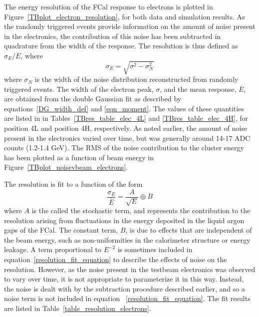 The energy resolution of the FCal response to electrons is plotted in Figure~\ref{TBplot_electron_resolution}, for both data and simulation results. As the randomly triggered events provide information on the amount of noise present in the electronics, the contribution of this noise has been subtracted in quadrature from the width of the response. The resolution is thus defined as $\sigma_E/\overline{E}$, where
\begin{equation}
\sigma_E = \sqrt{\sigma^2 - \sigma_N^2}
\end{equation}
where $\sigma_N$ is the width of the noise distribution reconstructed from randomly triggered events. The width of the electron peak, $\sigma$, and the mean response, $\overline{E}$, are obtained from the double Gaussian fit as described by equations~\ref{DG_width_def} and \ref{eqn_moment}. The values of these quantities are listed in in Tables~\ref{TBres_table_elec_4L} and \ref{TBres_table_elec_4H}, for position 4L and position 4H, respectively. As noted earlier, the amount of noise present in the electronics varied over time, but was generally around 14-17 ADC counts (1.2-1.4 GeV). The RMS of the noise contribution to the cluster energy has been plotted as a function of beam energy in Figure~\ref{TBplot_noisevbeam_electrons}.


The resolution is fit to a function of the form
\begin{equation}
\frac{\sigma_E}{\overline{E}} = \frac{A}{\sqrt{E}} \oplus B
\label{resolution_fit_equation}
\end{equation}
where $A$ is the called the stochastic term, and represents the contribution to the resolution arising from fluctuations in the energy deposited in the liquid argon gaps of the FCal. The constant term, $B$, is due to effects that are independent of the beam energy, such as non-uniformities in the calorimeter structure or energy leakage. A term proportional to $E^{-2}$ is sometimes included in equation~\ref{resolution_fit_equation} to describe the effects of noise on the resolution. However, as the noise present in the testbeam electronics was observed to vary over time, it is not appropriate to parameterize it in this way. Instead, the noise is dealt with by the subtraction procedure described earlier, and so a noise term is not included in equation ~\ref{resolution_fit_equation}. The fit results are listed in Table~\ref{table_resolution_electrons}.


